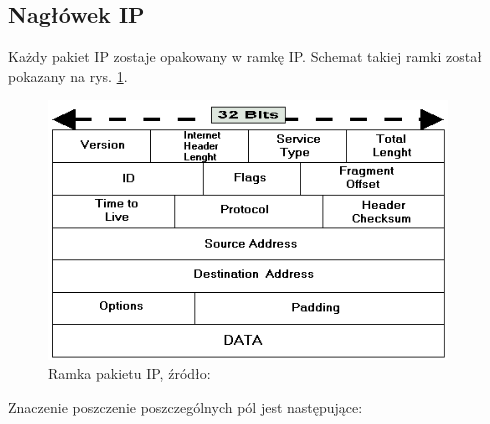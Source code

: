 		\subsection{Nagłówek IP}
			Każdy pakiet IP zostaje opakowany w ramkę IP.
			Schemat takiej ramki został pokazany na rys. \ref{fig:ramka_ip}.
			\begin{figure}[h]
				\centering
				\includegraphics[width=400px]{ip.png}
				\caption{Ramka pakietu IP, źródło: \cite{headers}}
				\label{fig:ramka_ip}
			\end{figure}
			Znaczenie poszczenie poszczególnych pól jest następujące:

